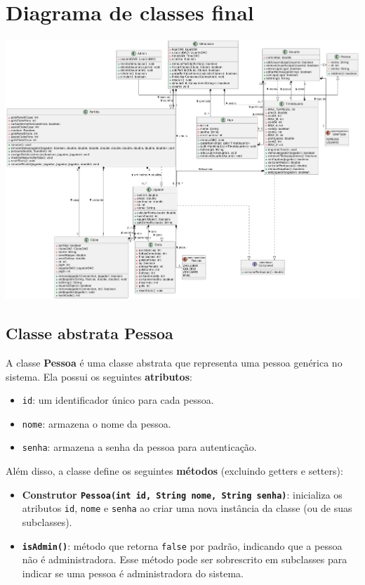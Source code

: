 \documentclass[12pt]{article}
\begin{document}
\section{Diagrama de classes final}
\label{sec:classes}

\includegraphics[width=\textwidth]{Diagrama.pdf}

\subsection{Classe abstrata Pessoa}

A classe \textbf{Pessoa} é uma classe abstrata que representa uma pessoa genérica no sistema. Ela possui os seguintes \textbf{atributos}:

\begin{itemize}
  \item \texttt{id}: um identificador único para cada pessoa.
  \item \texttt{nome}: armazena o nome da pessoa.
  \item \texttt{senha}: armazena a senha da pessoa para autenticação.
\end{itemize}

Além disso, a classe define os seguintes \textbf{métodos} (excluindo getters e setters):

\begin{itemize}
  \item \textbf{Construtor \texttt{Pessoa(int id, String nome, String senha)}}: inicializa os atributos \texttt{id}, \texttt{nome} e \texttt{senha} ao criar uma nova instância da classe (ou de suas subclasses).
  \item \textbf{\texttt{isAdmin()}}: método que retorna \texttt{false} por padrão, indicando que a pessoa não é administradora. Esse método pode ser sobrescrito em subclasses para indicar se uma pessoa é administradora do sistema.
\end{itemize}
\end{document}
